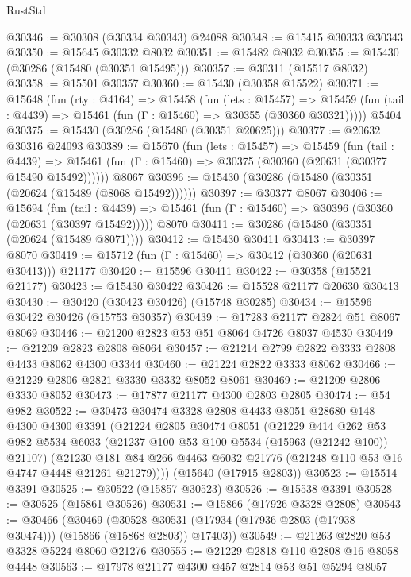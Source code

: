 \begin{lexlean}{RustStd}
\begin{coremodule}
{\begin{coremodule}
{{{{{{{{{{{{{{{{{{{{{{{{{{{{{{{{{{{{{{{{{{{{{{{{{{{{{{{{{{{{@30346 := @30308 (@30334 @30343) @24088
@30348 := @15415 @30333 @30343
@30350 := @15645 @30332 @8032
@30351 := @15482 @8032
@30355 := @15430 (@30286 (@15480 (@30351 @15495)))
@30357 := @30311 (@15517 @8032)
@30358 := @15501 @30357
@30360 := @15430 (@30358 @15522)
@30371 := @15648
    (fun (rty : @4164) =>
    @15458
      (fun (lets : @15457) =>
      @15459 (fun (tail : @4439) => @15461 (fun (Γ : @15460) => @30355 (@30360 @30321)))))
    @5404
@30375 := @15430 (@30286 (@15480 (@30351 @20625)))
@30377 := @20632 @30316 @24093
@30389 := @15670
    (fun (lets : @15457) =>
    @15459
      (fun (tail : @4439) =>
      @15461 (fun (Γ : @15460) => @30375 (@30360 (@20631 (@30377 @15490 @15492))))))
    @8067
@30396 := @15430 (@30286 (@15480 (@30351 (@20624 (@15489 (@8068 @15492))))))
@30397 := @30377 @8067
@30406 := @15694
    (fun (tail : @4439) => @15461 (fun (Γ : @15460) => @30396 (@30360 (@20631 (@30397 @15492)))))
    @8070
@30411 := @30286 (@15480 (@30351 (@20624 (@15489 @8071))))
@30412 := @15430 @30411
@30413 := @30397 @8070
@30419 := @15712 (fun (Γ : @15460) => @30412 (@30360 (@20631 @30413))) @21177
@30420 := @15596 @30411
@30422 := @30358 (@15521 @21177)
@30423 := @15430 @30422
@30426 := @15528 @21177 @20630 @30413
@30430 := @30420 (@30423 @30426) (@15748 @30285)
@30434 := @15596 @30422 @30426 (@15753 @30357)
@30439 := @17283 @21177 @2824 @51 @8067 @8069
@30446 := @21200 @2823 @53 @51 @8064 @4726 @8037 @4530
@30449 := @21209 @2823 @2808 @8064
@30457 := @21214 @2799 @2822 @3333 @2808 @4433 @8062 @4300 @3344
@30460 := @21224 @2822 @3333 @8062
@30466 := @21229 @2806 @2821 @3330 @3332 @8052 @8061
@30469 := @21209 @2806 @3330 @8052
@30473 := @17877 @21177 @4300 @2803 @2805
@30474 := @54 @982
@30522 := @30473
    @30474
    @3328
    @2808
    @4433
    @8051
    @28680
    @148
    @4300
    @4300
    @3391
    (@21224
      @2805
      @30474
      @8051
      (@21229
        @414
        @262
        @53
        @982
        @5534
        @6033
        (@21237 @100 @53 @100 @5534 (@15963 (@21242 @100)) @21107)
        (@21230 @181 @84 @266 @4463 @6032 @21776 (@21248 @110 @53 @16 @4747 @4448 @21261 @21279))))
    (@15640 (@17915 @2803))
@30523 := @15514 @3391
@30525 := @30522 (@15857 @30523)
@30526 := @15538 @3391
@30528 := @30525 (@15861 @30526)
@30531 := @15866 (@17926 @3328 @2808)
@30543 := @30466
    (@30469 (@30528 @30531 (@17934 (@17936 @2803 (@17938 @30474))) (@15866 (@15868 @2803)) @17403))
@30549 := @21263 @2820 @53 @3328 @5224 @8060 @21276
@30555 := @21229 @2818 @110 @2808 @16 @8058 @4448
@30563 := @17978 @21177 @4300 @457 @2814 @53 @51 @5294 @8057
}}}}}}}}}}}}}}}}}}}}}}}}}}}}}}}}}}}}}}}}}}}}}}}}}}}}}}}}}}}}
\end{coremodule}}
\end{coremodule}
\end{lexlean}
